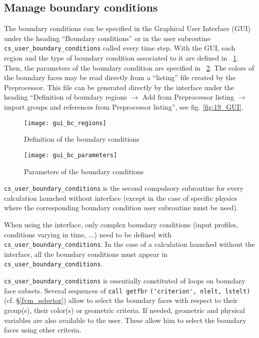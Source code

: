 {{{\subsection{Manage boundary conditions}
\label{prg_boundaryconditions}
The boundary conditions can be specified in the Graphical User Interface (GUI) under the heading ``Boundary conditions'' 
or in the user subroutine \texttt{cs\_user\_boundary\_conditions} called every time step. 
With the GUI, each region and the type of boundary condition associated to it are defined in 
\figurename~\ref{fig:gui_bc_regions}. Then, the parameters of the boundary condition are specified
 in \figurename~\ref{fig:gui_bc_parameters}. The colors of the boundary faces may be read directly from 
a ``listing'' file created by the Preprocessor. This file can be generated directly by the interface 
under the heading ``Definition of boundary regions $\rightarrow$ Add from Preprocessor listing $\rightarrow$ import groups and references from Preprocessor listing'', see fig. \ref{fig:19_GUI}.
%
\begin{figure}[!ht]
\begin{center}
\texttt{[image: gui\_bc\_regions]}
\caption{Definition of the boundary conditions}
\label{fig:gui_bc_regions}
\end{center}
\end{figure}
%
\begin{figure}[!ht]
\begin{center}
\texttt{[image: gui\_bc\_parameters]}
\caption{Parameters of the boundary conditions}
\label{fig:gui_bc_parameters}
\end{center}
\end{figure}

\texttt{cs\_user\_boundary\_conditions} is the second compulsory subroutine for every calculation launched
without interface (except in the case of specific physics where the
corresponding boundary condition user subroutine must be used).

When using the interface, only complex boundary conditions (input profiles, conditions varying in time, ...)
need to be defined with \texttt{cs\_user\_boundary\_conditions}.
In the case of a calculation launched without the
interface, all the boundary conditions must appear in \texttt{cs\_user\_boundary\_conditions}.

\texttt{cs\_user\_boundary\_conditions} is essentially constituted of loops on boundary
face subsets. Several sequences 
of \verb+call getfbr+ \verb+('criterion', nlelt, lstelt)+ (cf.
\S\ref{fvm_selector}) allow to select 
the boundary faces with respect to their group(s), their
color(s) or geometric criteria. If needed, geometric and
physical variables are also available to the user. These allow him
to select the boundary faces using other criteria.

}}}
